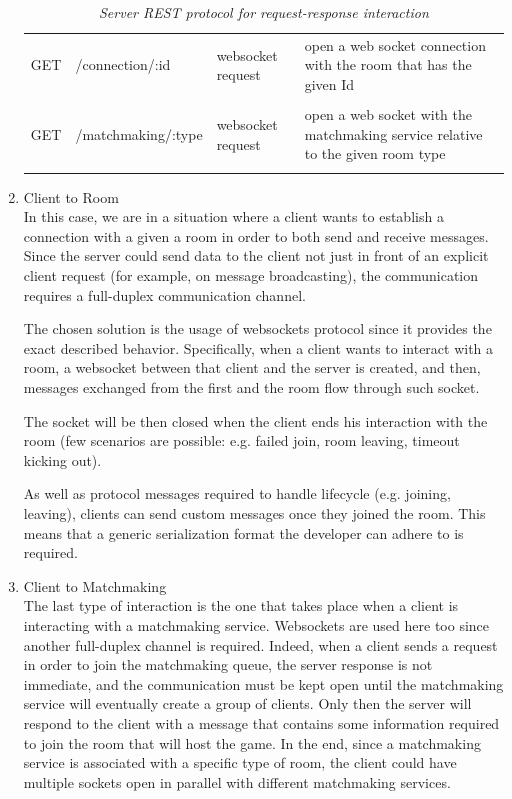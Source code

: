 \begin{enumerate}
\begin{table}[]
\begin{tabular}{p{2cm}p{4cm}p{2cm}p{5.5cm}}
			GET                  & /connection/:id    & websocket request & open a web socket connection with the room that has the given Id               	\\\\
			GET                  & /matchmaking/:type & websocket request & open a web socket with the matchmaking service relative to the given room type 	\\\\
		\end{tabular}
		\caption{\label{table:server_routes} \textit{Server REST protocol for request-response interaction}}
	\end{table}
	\item  Client to Room \\
	In this case, we are in a situation where a client wants to establish a connection with a given a room in order to both send and receive messages. Since the server could send data to the client not just in front of an explicit client request (for example, on message broadcasting), the communication requires a full-duplex communication channel.
	
	The chosen solution is the usage of websockets protocol since it provides the exact described behavior. Specifically, when a client wants to interact with a room, a websocket between that client and the server is created, and then, messages exchanged from the first and the room flow through such socket.
	
    The socket will be then closed when the client ends his interaction with the room (few scenarios are possible: e.g. failed join, room leaving, timeout kicking out).

 	As well as protocol messages required to handle lifecycle (e.g. joining, leaving),  clients can send custom messages once they joined the room. This means that a generic serialization format the developer can adhere to is required.
	
	
	\item Client to Matchmaking \\
	The last type of interaction is the one that takes place when a client is interacting with a matchmaking service. Websockets are used here too since another full-duplex channel is required. Indeed, when a client sends a request in order to join the matchmaking queue, the server response is not immediate, and the communication must be kept open until the matchmaking service will eventually create a group of clients. Only then the server will respond to the client with a message that contains some information required to join the room that will host the game.
	In the end, since a matchmaking service is associated with a specific type of room, the client could have multiple sockets open in parallel with different matchmaking services.
\end{enumerate}









